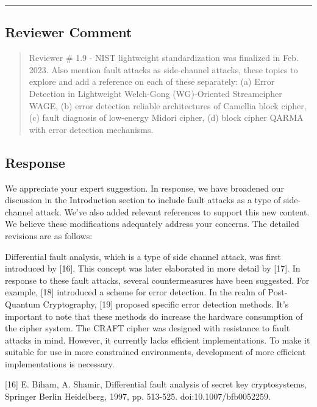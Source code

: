 \color{black}

\noindent\rule{\linewidth}{2.0pt}

\subsection{Reviewer Comment}
\begin{mdframed}
	\begin{quote}
		Reviewer \# 1.9 - NIST lightweight standardization was finalized in Feb. 2023. Also mention fault attacks as side-channel attacks, these topics to explore and add a reference on each of these separately: (a) Error Detection in Lightweight Welch-Gong (WG)-Oriented Streamcipher WAGE, (b) error detection reliable architectures of Camellia block cipher, (c) fault diagnosis of low-energy Midori cipher, (d) block cipher QARMA with error detection mechanisms.
	\end{quote}
\end{mdframed}

\subsection{Response}

We appreciate your expert suggestion. In response, we have broadened our discussion in the Introduction section to include fault attacks as a type of side-channel attack. We've also added relevant references to support this new content. We believe these modifications adequately address your concerns. The detailed revisions are as follows:

\color{blue}

Differential fault analysis, which is a type of side channel attack, was first introduced by [16]. This concept was later elaborated in more detail by [17]. In response to these fault attacks, several countermeasures have been suggested. For example, [18] introduced a scheme for error detection. In the realm of Post-Quantum Cryptography, [19] proposed specific error detection methods. It's important to note that these methods do increase the hardware consumption of the cipher system. The CRAFT cipher was designed with resistance to fault attacks in mind. However, it currently lacks efficient implementations. To make it suitable for use in more constrained environments, development of more efficient implementations is necessary.

[16] E. Biham, A. Shamir, Differential fault analysis of secret key cryptosystems, Springer Berlin Heidelberg, 1997, pp. 513-525. doi:10.1007/bfb0052259.


